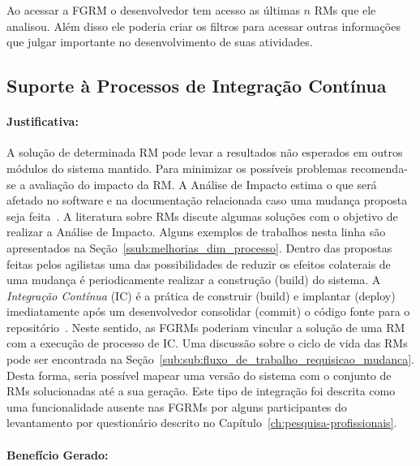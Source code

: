 Ao acessar a FGRM o desenvolvedor tem acesso as últimas $n$ RMs que ele
analisou. Além disso ele poderia criar os filtros para acessar outras
informações que julgar importante no desenvolvimento de suas atividades.

\subsection{Suporte à Processos de Integração Contínua}
\label{sub:suporte_integracao_continua}


\paragraph{Justificativa:}
\label{par:justificativa_s05}

A solução de determinada RM pode levar a resultados não esperados em outros
módulos do sistema mantido. Para minimizar os possíveis problemas recomenda-se a
avaliação do impacto da RM\@. A Análise de Impacto estima o que será afetado no
software e na documentação relacionada caso uma mudança proposta seja
feita~\cite{arnold1996software}. A literatura sobre RMs discute algumas soluções
com o objetivo de realizar a Análise de Impacto. Alguns exemplos de trabalhos
nesta linha são apresentados na Seção~\ref{ssub:melhorias_dim_processo}. Dentro
das propostas feitas pelos agilistas uma das possibilidades de reduzir os
efeitos colaterais de uma mudança é periodicamente realizar a construção (build)
do sistema. A \textit{Integração Contínua} (IC) é a prática de construir (build)
e implantar (deploy) imediatamente após um desenvolvedor consolidar (commit) o
código fonte para o repositório~\cite{aiello2010configuration}. Neste sentido,
as FGRMs poderiam vincular a solução de uma RM com a execução de processo de
IC\@. Uma discussão sobre o ciclo de vida das RMs pode ser encontrada na
Seção~\ref{sub:sub:fluxo_de_trabalho_requisicao_mudanca}. Desta forma, seria
possível mapear uma versão do sistema com o conjunto de RMs solucionadas até a
sua geração. Este tipo de integração foi descrita como uma funcionalidade
ausente nas FGRMs por alguns participantes do levantamento por questionário
descrito no Capítulo~\ref{ch:pesquisa-profissionais}.

\paragraph{Benefício Gerado:}
\label{par:papéis_afetados_s05}

